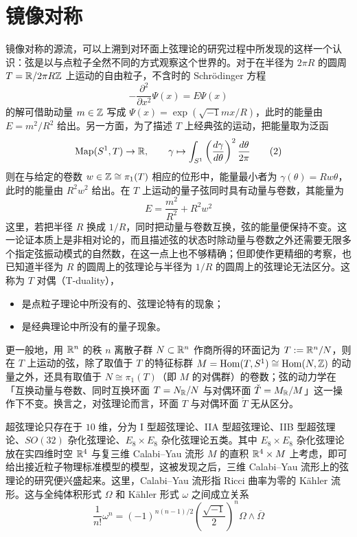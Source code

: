\section{镜像对称}

镜像对称的源流，可以上溯到对环面上弦理论的研究过程中所发现的这样一个认识：弦是以与点粒子全然不同的方式观察这个世界的。对于在半径为 $2\pi R$ 的圆周 $T=\mathbb{R}/2\pi R\mathbb{Z}$ 上运动的自由粒子，不含时的 Schr\"odinger 方程
\begin{equation}
-\frac{\partial^2}{\partial x^2}\Psi(x)=E\Psi(x)
\tag{1}
\end{equation}
\noindent 的解可借助动量 $m\in\mathbb{Z}$ 写成 $\Psi(x)=\exp\left(\sqrt{-1}mx/R\right)$，此时的能量由 $E=m^2/R^2$ 给出。另一方面，为了描述 $T$ 上经典弦的运动，把能量取为泛函
\begin{equation}
\operatorname{Map}(S^1,T)\to\mathbb{R},\qquad
\gamma\mapsto\int_{S^1}\left(\frac{d\gamma}{d\theta}\right)^2\frac{d\theta}{2\pi}
\tag{2}
\end{equation}
\noindent 则在与给定的卷数 $w\in\mathbb{Z}\cong\pi_1(T)$ 相应的位形中，能量最小者为 $\gamma(\theta)=Rw\theta$，此时的能量由 $R^2w^2$ 给出。在 $T$ 上运动的量子弦同时具有动量与卷数，其能量为
\begin{equation}
E=\frac{m^2}{R^2}+R^2w^2
\tag{3}
\end{equation}
\noindent 这里，若把半径 $R$ 换成 $1/R$，同时把动量与卷数互换，弦的能量便保持不变。这一论证本质上是非相对论的，而且描述弦的状态时除动量与卷数之外还需要无限多个指定弦振动模式的自然数，在这一点上也不够精确；但即使作更精细的考察，也已知道半径为 $R$ 的圆周上的弦理论与半径为 $1/R$ 的圆周上的弦理论无法区分。这称为 $T$ 对偶（T-duality），
\begin{itemize}[leftmargin=2.2em,itemsep=2pt,topsep=3pt]
\item 是点粒子理论中所没有的、弦理论特有的现象；
\item 是经典理论中所没有的量子现象。
\end{itemize}

更一般地，用 $\mathbb{R}^n$ 的秩 $n$ 离散子群 $N\subset\mathbb{R}^n$ 作商所得的环面记为 $T:=\mathbb{R}^n/N$，则在 $T$ 上运动的弦，除了取值于 $T$ 的特征标群 $M=\operatorname{Hom}(T,S^1)\cong\operatorname{Hom}(N,\mathbb{Z})$ 的动量之外，还具有取值于 $N\cong\pi_1(T)$（即 $M$ 的对偶群）的卷数；弦的动力学在「互换动量与卷数、同时互换环面 $T=N_{\mathbb{R}}/N$ 与对偶环面 $\check T=M_{\mathbb{R}}/M$」这一操作下不变。换言之，对弦理论而言，环面 $T$ 与对偶环面 $\check T$ 无从区分。

超弦理论只存在于 $10$ 维，分为 I 型超弦理论、IIA 型超弦理论、IIB 型超弦理论、$SO(32)$ 杂化弦理论、$E_8\times E_8$ 杂化弦理论五类。其中 $E_8\times E_8$ 杂化弦理论放在实四维时空 $\mathbb{R}^4$ 与复三维 Calabi--Yau 流形 $M$ 的直积 $\mathbb{R}^4\times M$ 上考虑，即可给出接近粒子物理标准模型的模型，这被发现之后，三维 Calabi--Yau 流形上的弦理论的研究便兴盛起来。这里，Calabi--Yau 流形指 Ricci 曲率为零的 K\"ahler 流形。这与全纯体积形式 $\Omega$ 和 K\"ahler 形式 $\omega$ 之间成立关系
\begin{equation}
\frac{1}{n!}\omega^n=(-1)^{n(n-1)/2}\left(\frac{\sqrt{-1}}{2}\right)^n\Omega\wedge\overline{\Omega}
\tag{4}
\end{equation}

